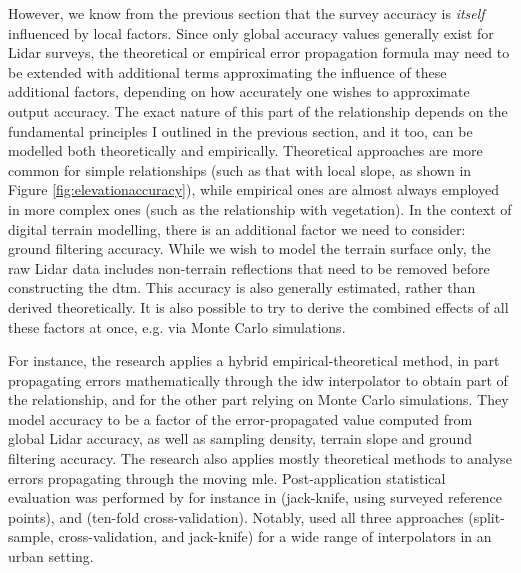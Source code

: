 However, we know from the previous section that the survey accuracy is \textit{itself} influenced by local factors. Since only global accuracy values generally exist for Lidar surveys, the theoretical or empirical error propagation formula may need to be extended with additional terms approximating the influence of these additional factors, depending on how accurately one wishes to approximate output accuracy. The exact nature of this part of the relationship depends on the fundamental principles I outlined in the previous section, and it too, can be modelled both theoretically and empirically. Theoretical approaches are more common for simple relationships (such as that with local slope, as shown in Figure \ref{fig:elevationaccuracy}), while empirical ones are almost always employed in more complex ones (such as the relationship with vegetation). In the context of digital terrain modelling, there is an additional factor we need to consider: ground filtering accuracy. While we wish to model the terrain surface only, the raw Lidar data includes non-terrain reflections that need to be removed before constructing the \ac{dtm}. This accuracy is also generally estimated, rather than derived theoretically. It is also possible to try to derive the combined effects of all these factors at once, e.g. via Monte Carlo simulations.

For instance, the research \cite{aguilar_etal_2010} applies a hybrid empirical-theoretical method, in part propagating errors mathematically through the \ac{idw} interpolator to obtain part of the relationship, and for the other part relying on Monte Carlo simulations. They model accuracy to be a factor of the error-propagated value computed from global Lidar accuracy, as well as sampling density, terrain slope and ground filtering accuracy. The research \cite{kraus_etal_2006} also applies mostly theoretical methods to analyse errors propagating through the moving \ac{mle}. Post-application statistical evaluation was performed by for instance in \cite{peng_shih_2006} (jack-knife, using surveyed reference points), and \cite{guo_etal_2010} (ten-fold cross-validation). Notably, \cite{smith_etal_2005} used all three approaches (split-sample, cross-validation, and jack-knife) for a wide range of interpolators in an urban setting.

